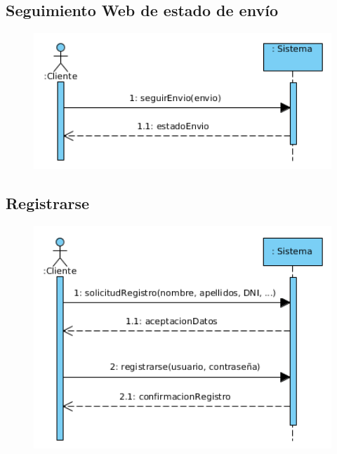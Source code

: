 \subsection{Seguimiento Web de estado de envío}
\begin{figure}[H]
	\centering
	\includegraphics[width=16cm]{52}
\end{figure}
\subsection{Registrarse}
\begin{figure}[H]
	\centering
	\includegraphics[width=16cm]{53}
\end{figure}
